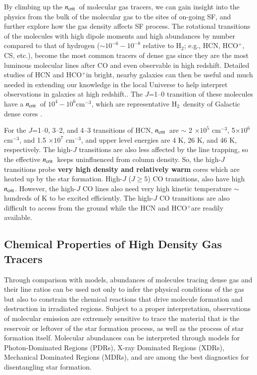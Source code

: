 \documentclass[legal,11pt]{article}
\def\cmt   {cm$^{-3}$\,}
\def\,{\thinspace}
\def\Htwo{H$_2$}
\def\ncrit{$n_{\rm crit}$}
\def\HCOP       {HCO$^{+}$}
\def\Htwo       {H$_2$}
\begin{document}
By climbing up the \ncrit\ of  molecular gas tracers, we can gain insight into
the physics from the bulk of the molecular gas to the sites of on-going SF, and
further explore how the gas density affects SF process.  The rotational
transitions of the molecules with high dipole moments and high abundances by
number compared to that of hydrogen ($\sim 10^{-6}-10^{-8}$ relative to \Htwo;
e.g., HCN, \HCOP, CS, etc.), become the most common tracers of dense gas since
they are the most luminous molecular lines after CO and even observable in high
redshift. Detailed studies of HCN and \HCOP in bright, nearby galaxies can then
be useful
and much needed in extending our knowledge in the local Universe to
help interpret observations in galaxies at
high redshift.. The $J$=1--0
transition of these molecules have a \ncrit\  of $10^4 - 10^6$\cmt, which are
representative \Htwo\ density of Galactic dense cores
\citep[e.g.,][]{Plume1997,weg05}. 



For the $J$=1--0, 3--2, and 4--3 transitions of HCN,  \ncrit\ are $\sim$ 2
$\times 10^5$ \cmt, 5$\times 10^6$ \cmt, and 1.5 $\times 10^7$ \cmt, and upper
level energies are 4 K, 26 K, and 46 K, respectively. The high-$J$ transitions
are also less affected by the line trapping, so the effective \ncrit\ keeps
uninfluenced from column density. So, the high-$J$ transitions probe {\bf very
high density and relatively warm} cores which are heated up by the star
formation. High-$J$ ($J\ge 5$) CO transitions, also have high \ncrit.  However,
the high-$J$ CO lines also need very high kinetic temperature $\sim$hundreds of
K to be excited efficiently. The high-$J$ CO transitions are also difficult to
access from the ground while the HCN and \HCOP are readily available.




\subsection{Chemical Properties of High Density Gas Tracers  }

Through comparison with models, abundances of molecules tracing dense gas and
their line ratios can be used not only to infer the physical conditions of the
gas but also to constrain the chemical reactions that drive molecule formation
and destruction in irradiated regions\citep[e.g.,][]{vandishoeck1998}. Subject
to a proper interpretation, observations of molecular emission are extremely
sensitive to trace the material that is the reservoir or leftover of the star
formation process, as well as the process of star formation itself. Molecular
abundances can be interpreted through models for Photon-Dominated Regions
(PDRs), X-ray Dominated Regions (XDRs), Mechanical Dominated Regions (MDRs),
and are among the best diagnostics for disentangling star formation.
\end{document}
